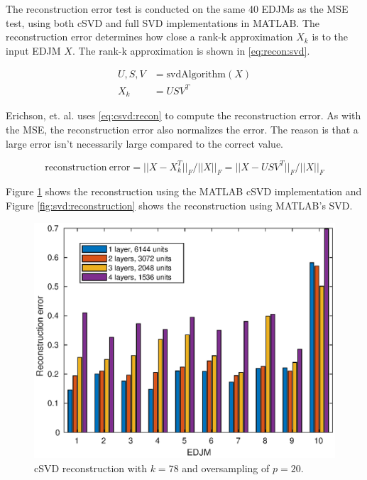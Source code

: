 The reconstruction error test is conducted on the same 40 EDJMs as the MSE test, using both cSVD and full SVD implementations in MATLAB. The reconstruction error determines how close a rank-k approximation $X_k$ is to the input EDJM $X$. The rank-k approximation is shown in \eqref{eq:recon:svd}.

\begin{equation}
  \label{eq:recon:svd}
  \begin{split}
    U,S,V &= \mathrm{svdAlgorithm}(X) \\
    X_k &= USV^T
  \end{split}
\end{equation}

Erichson, et. al. uses \eqref{eq:csvd:recon} \cite{erichson:csvd} to compute the reconstruction error. As with the MSE, the reconstruction error also normalizes the error. The reason is that a large error isn't necessarily large compared to the correct value.

\begin{equation}
  \label{eq:csvd:recon}
  \mathrm{reconstruction\ error} = ||X - X_k^T||_F/||X||_F = ||X - USV^T||_F/||X||_F
\end{equation}

Figure \ref{fig:csvd:reconstruction} shows the reconstruction using the MATLAB cSVD implementation and Figure \ref{fig:svd:reconstruction} shows the reconstruction using MATLAB's SVD.

\begin{figure}[H]
  \centering
  \includegraphics[scale=0.6]{Figures/csvd_reconstruction.eps}
  \caption{cSVD reconstruction with $k=78$ and oversampling of $p=20$.}
  \label{fig:csvd:reconstruction}
\end{figure}

